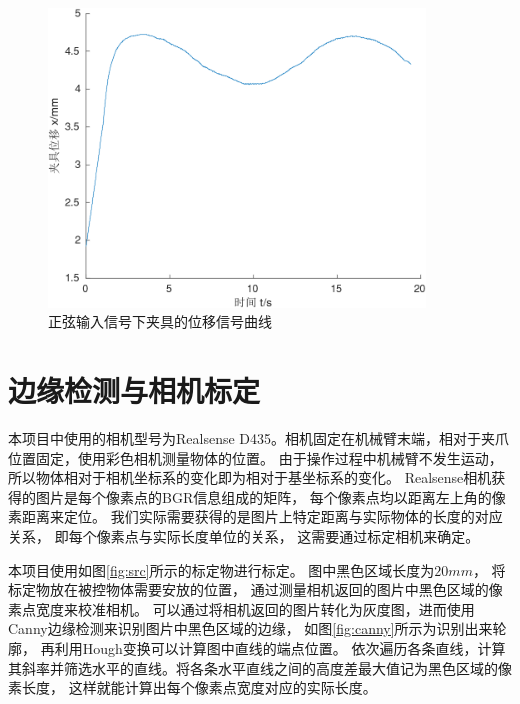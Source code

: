 \begin{figure}[!ht]
  \centering
  \includegraphics[width=10cm]{chapter04/pic/sin_x}
  \caption{\label{fig:sin_x}
    正弦输入信号下夹具的位移信号曲线}
  \vspace{-0.3cm}
\end{figure}

\section{边缘检测与相机标定}
本项目中使用的相机型号为Realsense D435。相机固定在机械臂末端，相对于夹爪位置固定，使用彩色相机测量物体的位置。
由于操作过程中机械臂不发生运动，
所以物体相对于相机坐标系的变化即为相对于基坐标系的变化。
Realsense相机获得的图片是每个像素点的BGR信息组成的矩阵，
每个像素点均以距离左上角的像素距离来定位。
我们实际需要获得的是图片上特定距离与实际物体的长度的对应关系，
即每个像素点与实际长度单位的关系， 这需要通过标定相机来确定。

本项目使用如图\ref{fig:src}所示的标定物进行标定。
图中黑色区域长度为$20mm$， 将标定物放在被控物体需要安放的位置，
通过测量相机返回的图片中黑色区域的像素点宽度来校准相机。
可以通过将相机返回的图片转化为灰度图，进而使用Canny边缘检测来识别图片中黑色区域的边缘，
如图\ref{fig:canny}所示为识别出来轮廓， 再利用Hough变换可以计算图中直线的端点位置。
依次遍历各条直线，计算其斜率并筛选水平的直线。将各条水平直线之间的高度差最大值记为黑色区域的像素长度，
这样就能计算出每个像素点宽度对应的实际长度。


